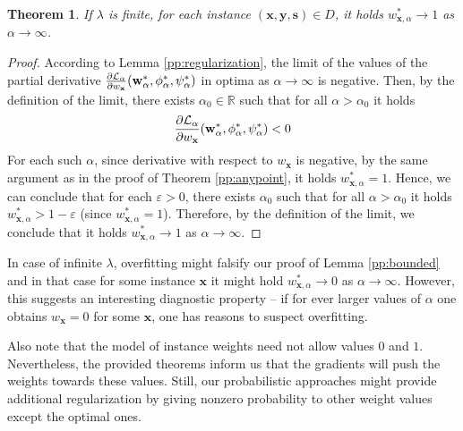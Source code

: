 \documentclass[preprint,12pt]{elsarticle}
\newtheorem{theorem}{Theorem}
\begin{document}
\begin{theorem}
	If $\lambda$ is finite, for each instance $(\mathbf{x},\mathbf{y},\mathbf{s})\in D$, it holds $w_{\mathbf{x},\alpha}^*\rightarrow 1$ as $\alpha\rightarrow\infty$.
	\label{pp:infty}
\end{theorem}
\begin{proof}
	According to Lemma \ref{pp:regularization},
	the limit of the values of the partial derivative $\frac{\partial{\cal L}_\alpha}{\partial w_\mathbf{x}}(\mathbf{w}^*_\alpha,\phi^*_\alpha,\psi^*_\alpha)$ in optima as $\alpha\rightarrow\infty$ is negative. Then, by the definition of the limit, there exists $\alpha_0\in \mathbb{R}$ such that for all $\alpha>\alpha_0$ it holds
	$$\frac{\partial{\cal L}_\alpha}{\partial w_\mathbf{x}}(\mathbf{w}^*_\alpha,\phi^*_\alpha,\psi^*_\alpha)<0$$
	For each such $\alpha$, since derivative with respect to $w_\mathbf{x}$ is negative, by the same argument as in the proof of Theorem \ref{pp:anypoint}, it holds $w^*_{\mathbf{x},\alpha}=1$. Hence, we can conclude that for each $\varepsilon>0$, there exists $\alpha_0$ such that for all $\alpha>\alpha_0$ it holds $w^*_{\mathbf{x},\alpha}>1-\varepsilon$  (since $w^*_{\mathbf{x},\alpha}=1$). Therefore, by the definition of the limit, we conclude that it holds $w^*_{\mathbf{x},\alpha}\rightarrow 1$ as $\alpha\rightarrow\infty$.
\end{proof}

In case of infinite $\lambda$, overfitting might falsify our proof of Lemma \ref{pp:bounded} and in that case for some instance $\mathbf{x}$ it might hold $w^*_{\mathbf{x},\alpha}\rightarrow 0$ as $\alpha\rightarrow\infty$. However, this suggests an interesting diagnostic property -- if for ever larger values of $\alpha$ one obtains $w_\mathbf{x}=0$ for some $\mathbf{x}$, one has reasons to suspect overfitting.

Also note that the model of instance weights need not allow values $0$ and $1$. Nevertheless, the provided theorems inform us that the gradients will push the weights towards these values. Still, our probabilistic approaches might provide additional regularization by giving nonzero probability to other weight values except the optimal ones.
\end{document}
